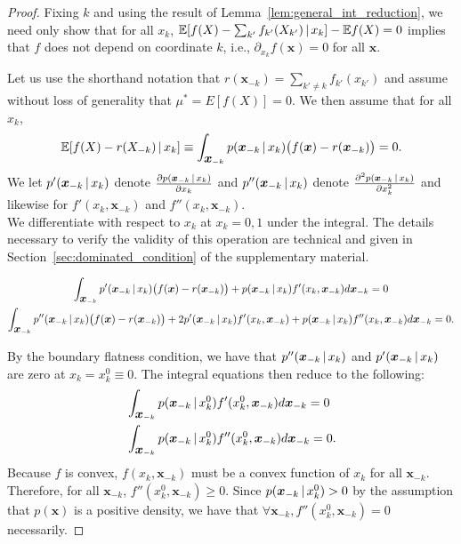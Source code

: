\begin{proof}

Fixing $k$ and using the result of
Lemma~\ref{lem:general_int_reduction}, 
we need only show that for all $x_k$, $ {\mathbb E}[ f(X) - \sum_{k'}
f_{k'}(X_{k'}) {\,|\,} x_k] - {\mathbb E} f(X) = 0 $ 
implies that $f$ does not depend on coordinate $k$, i.e., 
$\partial_{x_k} f(\mathbf{x}) = 0$ for all $\mathbf{x}$.

Let us use the shorthand notation that $r(\mathbf{x}_{-k}) = \sum_{k'
  \neq k} f_{k'}(x_{k'})$ and assume without loss of generality that
$\mu^* = E[f(X)] = 0$. We then assume that for all $x_k$,
\begin{equation}
 {\mathbb E}[ f(X) - r(X_{-k})  {\,|\,} x_k] \equiv 
 \int_{\mbox{\boldmath $x$}_{-k}}  p(\mbox{\boldmath $x$}_{-k} {\,|\,} x_k ) 
 \big(f(\mbox{\boldmath $x$}) - r(\mbox{\boldmath $x$}_{-k}) \big) = 0.
\end{equation}
We let $p'(\mbox{\boldmath $x$}_{-k} {\,|\,} x_k)$ denote 
$\frac{\partial p(\mbox{\boldmath $\scriptstyle x$}_{-k} {\,|\,} x_k)}{\partial x_k}$ and 
$p''(\mbox{\boldmath $x$}_{-k} {\,|\,} x_k)$ denote 
$\frac{\partial^2 p(\mbox{\boldmath $\scriptstyle x$}_{-k} {\,|\,} x_k)}{\partial x_k^2}$ and
likewise for $f'(x_k, \mathbf{x}_{-k})$ and $f''(x_k,
\mathbf{x}_{-k})$. \\

We differentiate with respect to $x_k$ at $x_k = 0,1$ under the
integral. The details necessary to verify the validity of this
operation are technical and given in
Section~\ref{sec:dominated_condition} of the supplementary material.

\begin{gather}
\int_{\mbox{\boldmath $x$}_{-k}} p'(\mbox{\boldmath $x$}_{-k} {\,|\,} x_k) 
\big( f(\mbox{\boldmath $x$}) - r(\mbox{\boldmath $x$}_{-k}) \big) + 
p(\mbox{\boldmath $x$}_{-k} {\,|\,} x_k) f'(x_k, \mbox{\boldmath $x$}_{-k}) d \mbox{\boldmath $x$}_{-k}  = 0 
\label{eqn:integral1a} \\
\int_{\mbox{\boldmath $x$}_{-k}} p''(\mbox{\boldmath $x$}_{-k} {\,|\,} x_k) 
\big( f(\mbox{\boldmath $x$}) - r(\mbox{\boldmath $x$}_{-k}) \big) 
    + 2 p'(\mbox{\boldmath $x$}_{-k} {\,|\,} x_k) f'(x_k, \mbox{\boldmath $x$}_{-k}) +
p(\mbox{\boldmath $x$}_{-k} {\,|\,} x_k) f''(x_k, \mbox{\boldmath $x$}_{-k}) d\mbox{\boldmath $x$}_{-k}  = 0 .
\end{gather}

By the boundary flatness condition, we have that $p''(\mbox{\boldmath $x$}_{-k}
{\,|\,} x_k)$ and $p'(\mbox{\boldmath $x$}_{-k} {\,|\,} x_k)$ are zero at $x_k =
x_k^0 \equiv 0$. The integral equations then reduce to the following:
\begin{align}
& \int_{\mbox{\boldmath $x$}_{-k}} p(\mbox{\boldmath $x$}_{-k} {\,|\,} x^0_k) f'(x^0_k, \mbox{\boldmath $x$}_{-k}) d \mbox{\boldmath $x$}_{-k}= 0 \label{eqn:integral1b} \\
& \int_{\mbox{\boldmath $x$}_{-k}} p(\mbox{\boldmath $x$}_{-k} {\,|\,} x^0_k) f''(x^0_k, \mbox{\boldmath $x$}_{-k}) d\mbox{\boldmath $x$}_{-k} = 0.
\end{align}
Because $f$ is convex, $f(x_k, \mathbf{x}_{-k})$ must be a convex
function of 
$x_k$ for all $\mathbf{x}_{-k}$. Therefore, for all $\mathbf{x}_{-k}$,
$f''(x^0_k, \mathbf{x}_{-k}) \geq 0$. Since $p(\mbox{\boldmath $x$}_{-k} {\,|\,}
x^0_k) > 0$ by the assumption that $p(\mathbf{x})$ is a positive density, 
we have that $\forall \mathbf{x}_{-k}, f''(x^0_k, \mathbf{x}_{-k}) = 0$ necessarily.


\end{proof}

